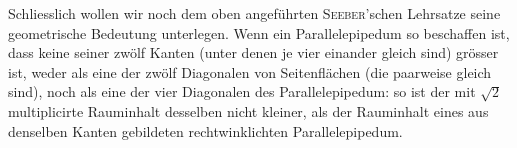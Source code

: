 Schliesslich wollen wir noch dem oben angeführten \textsc{Seeber}'schen Lehrsatze seine geometrische Bedeutung unterlegen. Wenn ein Parallelepipedum so beschaffen ist, dass keine seiner zwölf Kanten (unter denen je vier einander gleich sind) grösser ist, weder als eine der zwölf Diagonalen von Seitenflächen (die paarweise gleich sind), noch als eine der vier Diagonalen des Parallelepipedum: so ist der mit $\surd2$ multiplicirte Rauminhalt desselben nicht kleiner, als der Rauminhalt eines aus denselben Kanten gebildeten rechtwinklichten Parallelepipedum.
